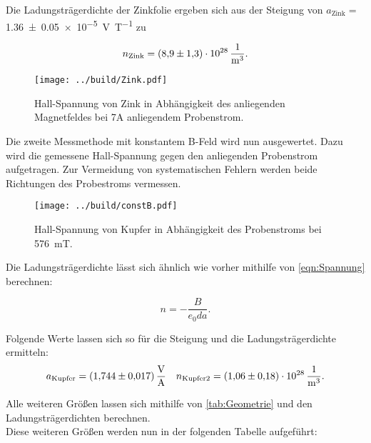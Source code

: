 \noindent Die Ladungsträgerdichte der Zinkfolie ergeben sich aus der Steigung von $a_\text{Zink}=$\qty{1.36\pm0.05e-5}{\volt\per\tesla}
zu 

\begin{equation*}
    n_\text{Zink} = \qty{8.9\pm1.3e28}{\per\cubic\meter}.
\end{equation*}

\begin{figure}[H]
    \centering
    \label{Zink}
    \texttt{[image: ../build/Zink.pdf]}
    \caption{Hall-Spannung von Zink in Abhängigkeit des anliegenden Magnetfeldes bei 7A anliegendem Probenstrom.}
\end{figure}

\noindent Die zweite Messmethode mit konstantem B-Feld wird nun ausgewertet. Dazu wird die gemessene Hall-Spannung 
gegen den anliegenden Probenstrom aufgetragen. Zur Vermeidung von systematischen Fehlern werden beide Richtungen des 
Probestroms vermessen.

\begin{figure}[H]
    \centering
    \texttt{[image: ../build/constB.pdf]}
    \caption{Hall-Spannung von Kupfer in Abhängigkeit des Probenstroms bei \qty{576}{\milli\tesla}.}
\end{figure}

\noindent Die Ladungsträgerdichte lässt sich ähnlich wie vorher mithilfe von \eqref{eqn:Spannung} berechnen:

\begin{equation*}
    n = - \frac{B}{e_0 d a}.
\end{equation*}

\noindent Folgende Werte lassen sich so für die Steigung und die Ladungsträgerdichte ermitteln:
\begin{align*}
    a_\text{Kupfer}=\qty{1.744 \pm 0.017}{\volt\per\ampere} && n_\text{Kupfer2} = \qty{1.06\pm0.18e28}{\per\cubic\meter}.
\end{align*}

\noindent Alle weiteren Größen lassen sich mithilfe von \autoref{tab:Geometrie} und den Ladungsträgerdichten 
berechnen.\\
\noindent Diese weiteren Größen werden nun in der folgenden Tabelle aufgeführt:

